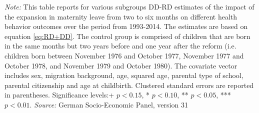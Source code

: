 \documentclass[a4paper ]{article}
\newlength\FHoffset
\begin{document}
\begin{table}[p] \centering
\def\sym#1{\ifmmode^{#1}\else\(^{#1}\)\fi}
\caption{Heterogenity Analysis for Health Behavior, DD-RD Estimates with Covariates}\label{tab:Heterog_HBCV}
\begin{minipage}{0.98\textwidth} %
{\footnotesize \textit{Note:} This table reports for various subgroups DD-RD estimates of the impact of the expansion in maternity leave from two to six months on different health behavior outcomes over the period from 1993-2014. The estimates are based on equation \ref{eq:RD+DD}. The control group is comprised of children that are born in the same months but two years before and one year after the reform (i.e. children born between November 1976 and October 1977, November 1977 and October 1978, and November 1979 and October 1980). The covariate vector includes sex, migration background, age, squared age, parental type of school, parental citizenship and age at childbirth.\newline
Clustered standard errors are reported in parentheses. Significance levels:+ \(p<0.15\), * \(p<0.10\), ** \(p<0.05\), *** \(p<0.01\). \newline \textit{Source: }German Socio-Economic Panel, version 31\par}
\end{minipage}
\end{table}
\restoregeometry

\clearpage











\newpage
{}	

	
		\setlength\FHoffset{0cm} 
\fancyheadoffset{\FHoffset}	
\end{document}
